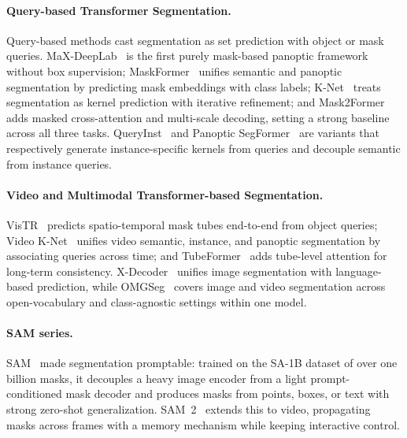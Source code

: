 \paragraph{Query-based Transformer Segmentation.}
Query-based methods cast segmentation as set prediction with object or mask queries. MaX-DeepLab~\cite{wang2021maxdeeplab} is the first purely mask-based panoptic framework without box supervision; MaskFormer~\cite{cheng2021maskformer} unifies semantic and panoptic segmentation by predicting mask embeddings with class labels; K-Net~\cite{zhang2021knet} treats segmentation as kernel prediction with iterative refinement; and Mask2Former~\cite{cheng2022mask2former} adds masked cross-attention and multi-scale decoding, setting a strong baseline across all three tasks. QueryInst~\cite{fang2021queryinst} and Panoptic SegFormer~\cite{li2022panopticsegformer} are variants that respectively generate instance-specific kernels from queries and decouple semantic from instance queries.


\paragraph{Video and Multimodal Transformer-based Segmentation.}
VisTR~\cite{wang2021vistr} predicts spatio-temporal mask tubes end-to-end from object queries; Video K-Net~\cite{li2022videoknet} unifies video semantic, instance, and panoptic segmentation by associating queries across time; and TubeFormer~\cite{wang2022tubeformer} adds tube-level attention for long-term consistency. X-Decoder~\cite{zou2023xdecoder} unifies image segmentation with language-based prediction, while OMGSeg~\cite{OMGSeg} covers image and video segmentation across open-vocabulary and class-agnostic settings within one model.


\paragraph{SAM series.} SAM~\cite{kirillov2023sam} made segmentation promptable: trained on the SA-1B dataset of over one billion masks, it decouples a heavy image encoder from a light prompt-conditioned mask decoder and produces masks from points, boxes, or text with strong zero-shot generalization. SAM~2~\cite{ravi2024sam2} extends this to video, propagating masks across frames with a memory mechanism while keeping interactive control.

